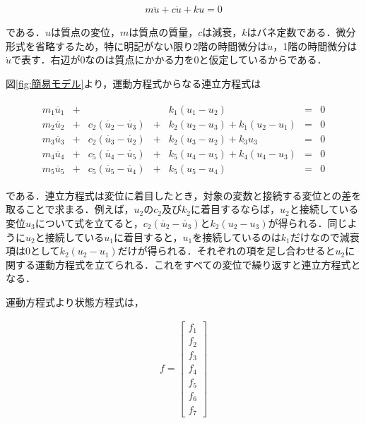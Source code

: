 \begin{eqnarray}
    m\ddot{u} + c\dot{u} + ku = 0
\end{eqnarray}

である．$u$は質点の変位，$m$は質点の質量，$c$は減衰，$k$はバネ定数である．微分形式を省略するため，特に明記がない限り2階の時間微分は$\ddot{u}$，1階の時間微分は$\dot{u}$で表す．右辺が$0$なのは質点にかかる力を$0$と仮定しているからである．

図\ref{fig:簡易モデル}より，運動方程式からなる連立方程式は

\begin{eqnarray}
    \begin{matrix}
        m_1 \ddot{u_1} &+&  & & k_1 (u_1 - u_2) &=& 0 \\ 
        m_2 \ddot{u_2} &+& c_2(\dot{u_2} - \dot{u_3}) &+& k_2 (u_2 - u_3) + k_1 (u_2 - u_1) &=& 0 \\ 
        m_3 \ddot{u_3} &+& c_2(\dot{u_3} - \dot{u_2}) &+& k_2 (u_3 - u_2) + k_3 u_3 &=& 0 \\ 
        m_4 \ddot{u_4} &+& c_5(\dot{u_4} - \dot{u_5}) &+& k_5 (u_4 - u_5) + k_4 (u_4 - u_3) &=& 0 \\ 
        m_5 \ddot{u_5} &+& c_5(\dot{u_5} - \dot{u_4}) &+& k_5 (u_5 - u_4) &=& 0
    \end{matrix}        
\end{eqnarray}

である．連立方程式は変位に着目したとき，対象の変数と接続する変位との差を取ることで求まる．例えば，$u_2$の$c_2$及び$k_2$に着目するならば，$u_2$と接続している変位$u_3$について式を立てると，$c_2(\dot{u_2} - \dot{u_3})$と$k_2(u_2 - u_3)$が得られる．同じように$u_2$と接続している$u_1$に着目すると，$u_1$を接続しているのは$k_1$だけなので減衰項は$0$として$k_2(u_2 - u_1)$だけが得られる．それぞれの項を足し合わせると$u_2$に関する運動方程式を立てられる．これをすべての変位で繰り返すと連立方程式となる．

運動方程式より状態方程式は，

\begin{eqnarray}
    f = 
    \left[\begin{matrix}
        f_1 \\
        f_2 \\
        f_3 \\
        f_4 \\
        f_5 \\
        f_6 \\
        f_7
    \end{matrix}\right]
\end{eqnarray}

